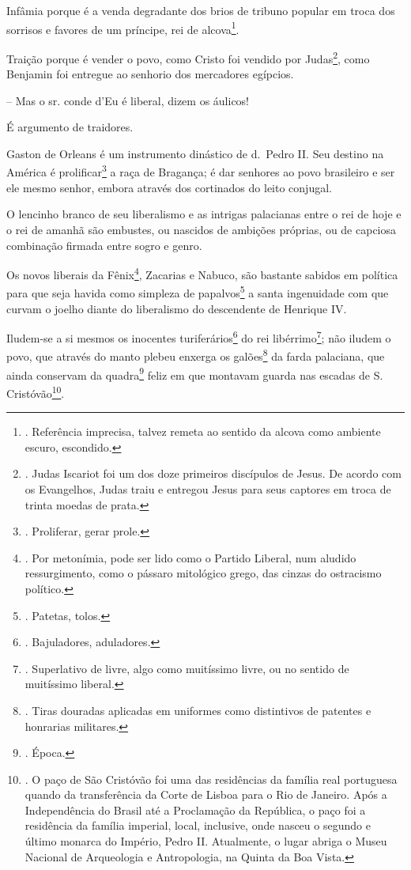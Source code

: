 Infâmia porque é a venda degradante dos brios de tribuno popular em
troca dos sorrisos e favores de um príncipe, rei de alcova\footnote{.
  Referência imprecisa, talvez remeta ao sentido da alcova como ambiente
  escuro, escondido.}.

Traição porque é vender o povo, como Cristo foi vendido por
Judas\footnote{. Judas Iscariot foi um dos doze primeiros discípulos de
  Jesus. De acordo com os Evangelhos, Judas traiu e entregou Jesus para
  seus captores em troca de trinta moedas de prata.}, como Benjamin foi
entregue ao senhorio dos mercadores egípcios.

-- Mas o sr. conde d'Eu é liberal, dizem os áulicos!

É argumento de traidores.

Gaston de Orleans é um instrumento dinástico de d.~Pedro II. Seu destino
na América é prolificar\footnote{. Proliferar, gerar prole.} a raça de
Bragança; é dar senhores ao povo brasileiro e ser ele mesmo senhor,
embora através dos cortinados do leito conjugal.

O lencinho branco de seu liberalismo e as intrigas palacianas entre o
rei de hoje e o rei de amanhã são embustes, ou nascidos de ambições
próprias, ou de capciosa combinação firmada entre sogro e genro.

Os novos liberais da Fênix\footnote{. Por metonímia, pode ser lido como
  o Partido Liberal, num aludido ressurgimento, como o pássaro
  mitológico grego, das cinzas do ostracismo político.}, Zacarias e
Nabuco, são bastante sabidos em política para que seja havida como
simpleza de papalvos\footnote{. Patetas, tolos.} a santa ingenuidade com
que curvam o joelho diante do liberalismo do descendente de Henrique IV.

Iludem-se a si mesmos os inocentes turiferários\footnote{. Bajuladores,
  aduladores.} do rei libérrimo\footnote{. Superlativo de livre, algo
  como muitíssimo livre, ou no sentido de muitíssimo liberal.}; não
iludem o povo, que através do manto plebeu enxerga os galões\footnote{.
  Tiras douradas aplicadas em uniformes como distintivos de patentes e
  honrarias militares.} da farda palaciana, que ainda conservam da
quadra\footnote{. Época.} feliz em que montavam guarda nas escadas de S.
Cristóvão\footnote{. O paço de São Cristóvão foi uma das residências da
  família real portuguesa quando da transferência da Corte de Lisboa
  para o Rio de Janeiro. Após a Independência do Brasil até a
  Proclamação da República, o paço foi a residência da família imperial,
  local, inclusive, onde nasceu o segundo e último monarca do Império,
  Pedro II. Atualmente, o lugar abriga o Museu Nacional de Arqueologia e
  Antropologia, na Quinta da Boa Vista.}.

